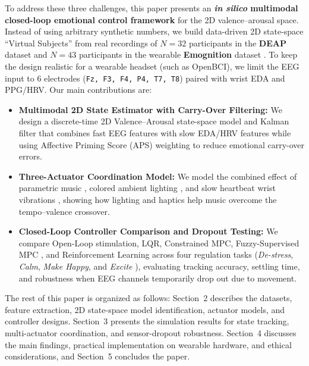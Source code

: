 \documentclass[preprint,12pt]{elsarticle}
\begin{document}
To address these three challenges, this paper presents an \textbf{\emph{in silico} multimodal closed-loop emotional control framework} for the 2D valence--arousal space. Instead of using arbitrary synthetic numbers, we build data-driven 2D state-space ``Virtual Subjects'' from real recordings of $N=32$ participants in the \textbf{DEAP} dataset \cite{koelstra2012deap} and $N=43$ participants in the wearable \textbf{Emognition} dataset \cite{saganowski2022emognition}. To keep the design realistic for a wearable headset (such as OpenBCI), we limit the EEG input to 6 electrodes (\texttt{Fz, F3, F4, P4, T7, T8}) paired with wrist EDA and PPG/HRV. Our main contributions are:
\begin{itemize}
    \item \textbf{Multimodal 2D State Estimator with Carry-Over Filtering:} We design a discrete-time 2D Valence--Arousal state-space model and Kalman filter that combines fast EEG features with slow EDA/HRV features while using Affective Priming Score (APS) weighting \cite{gutierrez2025affective} to reduce emotional carry-over errors.
    \item \textbf{Three-Actuator Coordination Model:} We model the combined effect of parametric music \cite{ehrlich2019closed,agres2023affectmachine,agres2025affectmachine}, colored ambient lighting \cite{li2025designing}, and slow heartbeat wrist vibrations \cite{azevedo2017calming}, showing how lighting and haptics help music overcome the tempo--valence crossover.
    \item \textbf{Closed-Loop Controller Comparison and Dropout Testing:} We compare Open-Loop stimulation, LQR, Constrained MPC, Fuzzy-Supervised MPC \cite{azgomi2022enhancement}, and Reinforcement Learning \cite{humaidan2026first} across four regulation tasks (\emph{De-stress}, \emph{Calm}, \emph{Make Happy}, and \emph{Excite} \cite{daly2016affective}), evaluating tracking accuracy, settling time, and robustness when EEG channels temporarily drop out due to movement.
\end{itemize}

The rest of this paper is organized as follows: Section~2 describes the datasets, feature extraction, 2D state-space model identification, actuator models, and controller designs. Section~3 presents the simulation results for state tracking, multi-actuator coordination, and sensor-dropout robustness. Section~4 discusses the main findings, practical implementation on wearable hardware, and ethical considerations, and Section~5 concludes the paper.



\end{document}
